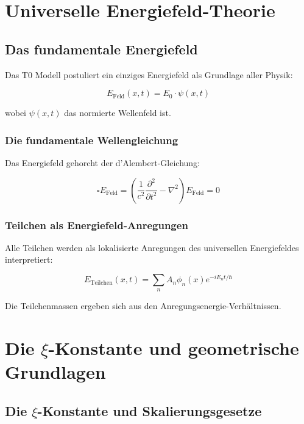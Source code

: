 \documentclass[12pt,a4paper]{report}
\begin{document}
	\chapter{Universelle Energiefeld-Theorie}
	
	\section{Das fundamentale Energiefeld}
	
	Das T0 Modell postuliert ein einziges Energiefeld als Grundlage aller Physik:
	
	\begin{equation}
		E_{\text{Feld}}(x,t) = E_0 \cdot \psi(x,t)
	\end{equation}
	
	wobei $\psi(x,t)$ das normierte Wellenfeld ist.
	
	\subsection{Die fundamentale Wellengleichung}
	
	Das Energiefeld gehorcht der d'Alembert-Gleichung:
	
	\begin{equation}
		\square E_{\text{Feld}} = \left(\frac{1}{c^2}\frac{\partial^2}{\partial t^2} - \nabla^2\right) E_{\text{Feld}} = 0
	\end{equation}
	
	\subsection{Teilchen als Energiefeld-Anregungen}
	
	Alle Teilchen werden als lokalisierte Anregungen des universellen Energiefeldes interpretiert:
	
	\begin{equation}
		E_{\text{Teilchen}}(x,t) = \sum_n A_n \phi_n(x) e^{-iE_n t/\hbar}
	\end{equation}
	
	Die Teilchenmassen ergeben sich aus den Anregungsenergie-Verhältnissen.
	
	\chapter{Die $\xi$-Konstante und geometrische Grundlagen}
	
\section{Die $\xi$-Konstante und Skalierungsgesetze}
\end{document}

